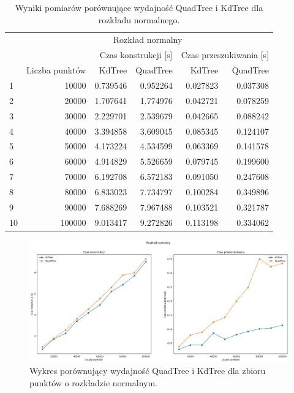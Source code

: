 \documentclass{lab}
\begin{document}
\begin{table}[H]
\centering
\begin{tabular}{lrrrrr}
  \toprule
   & \multicolumn{5}{c}{Rozkład normalny} \\
   &  & \multicolumn{2}{r}{Czas konstrukcji [s]} & \multicolumn{2}{r}{Czas przeszukiwania [s]} \\
   & Liczba punktów & KdTree & QuadTree & KdTree & QuadTree \\
  \midrule
1 & 10000 & 0.739546 & 0.952264 & 0.027823 & 0.037308 \\
2 & 20000 & 1.707641 & 1.774976 & 0.042721 & 0.078259 \\
3 & 30000 & 2.229701 & 2.539679 & 0.042665 & 0.088242 \\
4 & 40000 & 3.394858 & 3.609045 & 0.085345 & 0.124107 \\
5 & 50000 & 4.173224 & 4.534599 & 0.063369 & 0.141578 \\
6 & 60000 & 4.914829 & 5.526659 & 0.079745 & 0.199600 \\
7 & 70000 & 6.192708 & 6.572183 & 0.091050 & 0.247608 \\
8 & 80000 & 6.833023 & 7.734797 & 0.100284 & 0.349896 \\
9 & 90000 & 7.688269 & 7.967488 & 0.103521 & 0.321787 \\
10 & 100000 & 9.013417 & 9.272826 & 0.113198 & 0.334062 \\
  \bottomrule
  \end{tabular}
\caption{Wyniki pomiarów porównujące wydajność QuadTree i KdTree dla rozkładu normalnego.}
\label{tab:normal_time}
\end{table}  

\begin{figure}[H]
  \centering
  \includegraphics[width=1\textwidth]{resources/normal_graph.png}
  \caption{Wykres porównujący wydajność QuadTree i KdTree dla zbioru punktów o rozkładzie normalnym.}
  \label{fig:normal_graph}
\end{figure}
\end{document}
